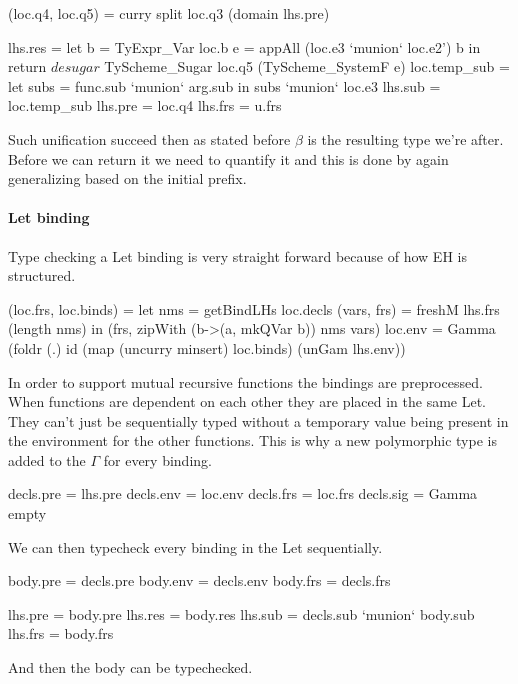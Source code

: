 \begin{code}       
       (loc.q4, loc.q5) = curry split loc.q3 (domain lhs.pre)
    
       lhs.res = let b = TyExpr_Var loc.b
                     e = appAll (loc.e3 `munion` loc.e2') b
                 in return $ desugar $ TyScheme_Sugar loc.q5 (TyScheme_SystemF e)
       loc.temp_sub = let subs = func.sub `munion` arg.sub 
                      in subs `munion` loc.e3
       lhs.sub = loc.temp_sub
       lhs.pre = loc.q4
       lhs.frs = u.frs
\end{code}
Such unification succeed then as stated before $\beta$ is the resulting type we're after. Before we can return it we need to quantify it and this is done by again generalizing based on the initial prefix.

\paragraph{Let binding}
Type checking a Let binding is very straight forward because of how EH is structured.

\begin{code}
        (loc.frs, loc.binds)  = let nms         = getBindLHs loc.decls
                                    (vars, frs) = freshM lhs.frs (length nms)
                                in (frs, zipWith (\a b->(a, mkQVar b)) nms vars)
        loc.env   = Gamma (foldr (.) id (map (uncurry minsert) loc.binds) (unGam lhs.env))
\end{code}
In order to support mutual recursive functions the bindings are preprocessed. When functions are dependent on each other they are placed in the same Let. They can't just be sequentially typed without a temporary value being present in the environment for the other functions. This is why a new polymorphic type is added to the $\Gamma$ for every binding.

\begin{code}
        decls.pre = lhs.pre
        decls.env = loc.env
        decls.frs = loc.frs
        decls.sig = Gamma empty
\end{code}
We can then typecheck every binding in the Let sequentially.

\begin{code}
        body.pre = decls.pre
        body.env = decls.env 
        body.frs = decls.frs

        lhs.pre = body.pre
        lhs.res = body.res
        lhs.sub = decls.sub `munion` body.sub
        lhs.frs = body.frs
\end{code}
And then the body can be typechecked.

